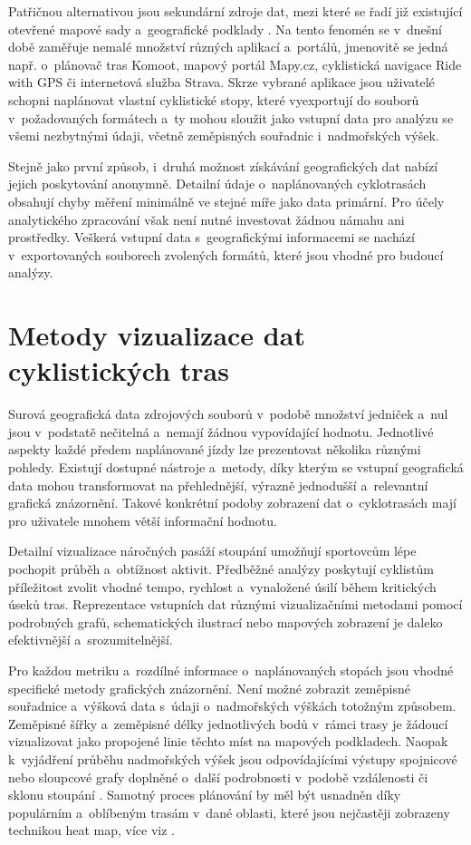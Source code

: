 Patřičnou alternativou jsou sekundární zdroje dat, mezi které se řadí již existující otevřené mapové sady a~geografické podklady \cite{KlufovaRenata2016}.
Na tento fenomén se v~dnešní době zaměřuje nemalé množství různých aplikací a~portálů, jmenovitě se jedná např. o~plánovač tras Komoot, mapový portál Mapy.cz, cyklistická navigace Ride with GPS či internetová služba Strava.
Skrze vybrané aplikace jsou uživatelé schopni naplánovat vlastní cyklistické stopy, které vyexportují do souborů v~požadovaných formátech a~ty mohou sloužit jako vstupní data pro analýzu se všemi nezbytnými údaji, včetně zeměpisných souřadnic i~nadmořských výšek.

Stejně jako první způsob, i~druhá možnost získávání geografických dat nabízí jejich poskytování anonymně.
Detailní údaje o~naplánovaných cyklotrasách obsahují chyby měření minimálně ve stejné míře jako data primární.
Pro účely analytického zpracování však není nutné investovat žádnou námahu ani prostředky.
Veškerá vstupní data s~geografickými informacemi se nachází v~exportovaných souborech zvolených formátů, které jsou vhodné pro budoucí analýzy.

\section{Metody vizualizace dat cyklistických tras}
\label{cycle-route-data-visualisation-methods}

Surová geografická data zdrojových souborů v~podobě množství jedniček a~nul jsou v~podstatě nečitelná a~nemají žádnou vypovídající hodnotu.
Jednotlivé aspekty každé předem naplánované jízdy lze prezentovat několika různými pohledy.
Existují dostupné nástroje a~metody, díky kterým se vstupní geografická data mohou transformovat na přehlednější, výrazně jednodušší a~relevantní grafická znázornění.
Takové konkrétní podoby zobrazení dat o~cyklotrasách mají pro uživatele mnohem větší informační hodnotu.

Detailní vizualizace náročných pasáží stoupání umožňují sportovcům lépe pochopit průběh a~obtížnost aktivit.
Předběžné analýzy poskytují cyklistům příležitost zvolit vhodné tempo, rychlost a~vynaložené úsilí během kritických úseků tras.
Reprezentace vstupních dat různými vizualizačními metodami pomocí podrobných grafů, schematických ilustrací nebo mapových zobrazení je daleko efektivnější a~srozumitelnější.

Pro každou metriku a~rozdílné informace o~naplánovaných stopách jsou vhodné specifické metody grafických znázornění.
Není možné zobrazit zeměpisné souřadnice a~výšková data s~údaji o~nadmořských výškách totožným způsobem.
Zeměpisné šířky a~zeměpisné délky jednotlivých bodů v~rámci trasy je žádoucí vizualizovat jako propojené linie těchto míst na mapových podkladech.
Naopak k~vyjádření průběhu nadmořských výšek jsou odpovídajícími výstupy spojnicové nebo sloupcové grafy doplněné o~další podrobnosti v~podobě vzdálenosti či sklonu stoupání \cite{BruggerAnnina2017}.
Samotný proces plánování by měl být usnadněn díky populárním a~oblíbeným trasám v~dané oblasti, které jsou nejčastěji zobrazeny technikou heat map, více viz \cite{PokojskiWojciech2021}.

